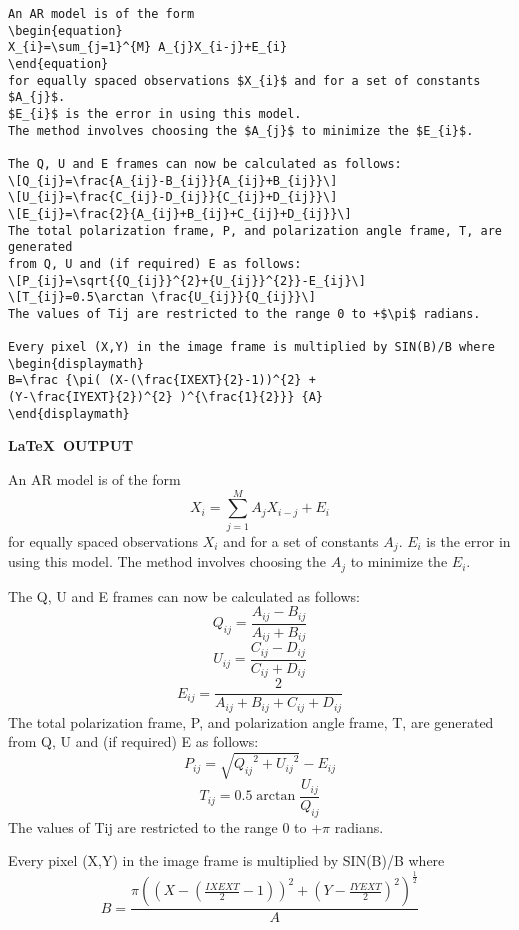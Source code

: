 \begin{verbatim}
An AR model is of the form
\begin{equation}
X_{i}=\sum_{j=1}^{M} A_{j}X_{i-j}+E_{i}
\end{equation}
for equally spaced observations $X_{i}$ and for a set of constants $A_{j}$.
$E_{i}$ is the error in using this model.
The method involves choosing the $A_{j}$ to minimize the $E_{i}$.

The Q, U and E frames can now be calculated as follows:
\[Q_{ij}=\frac{A_{ij}-B_{ij}}{A_{ij}+B_{ij}}\]
\[U_{ij}=\frac{C_{ij}-D_{ij}}{C_{ij}+D_{ij}}\]
\[E_{ij}=\frac{2}{A_{ij}+B_{ij}+C_{ij}+D_{ij}}\]
The total polarization frame, P, and polarization angle frame, T, are generated
from Q, U and (if required) E as follows:
\[P_{ij}=\sqrt{{Q_{ij}}^{2}+{U_{ij}}^{2}}-E_{ij}\]
\[T_{ij}=0.5\arctan \frac{U_{ij}}{Q_{ij}}\]
The values of Tij are restricted to the range 0 to +$\pi$ radians.

Every pixel (X,Y) in the image frame is multiplied by SIN(B)/B where
\begin{displaymath}
B=\frac {\pi( (X-(\frac{IXEXT}{2}-1))^{2} + 
(Y-\frac{IYEXT}{2})^{2} )^{\frac{1}{2}}} {A}
\end{displaymath}
\end{verbatim}

\newpage

\begin{center}
{\bf \LaTeX\ OUTPUT}
\end{center}

An AR model is of the form
\begin{equation}
X_{i}=\sum_{j=1}^{M} A_{j}X_{i-j}+E_{i}
\end{equation}
for equally spaced observations $X_{i}$ and for a set of constants $A_{j}$.
$E_{i}$ is the error in using this model.
The method involves choosing the $A_{j}$ to minimize the $E_{i}$.

The Q, U and E frames can now be calculated as follows:
\[Q_{ij}=\frac{A_{ij}-B_{ij}}{A_{ij}+B_{ij}}\]
\[U_{ij}=\frac{C_{ij}-D_{ij}}{C_{ij}+D_{ij}}\]
\[E_{ij}=\frac{2}{A_{ij}+B_{ij}+C_{ij}+D_{ij}}\]
The total polarization frame, P, and polarization angle frame, T, are generated
from Q, U and (if required) E as follows:
\[P_{ij}=\sqrt{{Q_{ij}}^{2}+{U_{ij}}^{2}}-E_{ij}\]
\[T_{ij}=0.5\arctan \frac{U_{ij}}{Q_{ij}}\]
The values of Tij are restricted to the range 0 to +$\pi$ radians.

Every pixel (X,Y) in the image frame is multiplied by SIN(B)/B where
\begin{displaymath}
B=\frac {\pi( (X-(\frac{IXEXT}{2}-1))^{2} + 
(Y-\frac{IYEXT}{2})^{2} )^{\frac{1}{2}}} {A}
\end{displaymath}
\newpage

